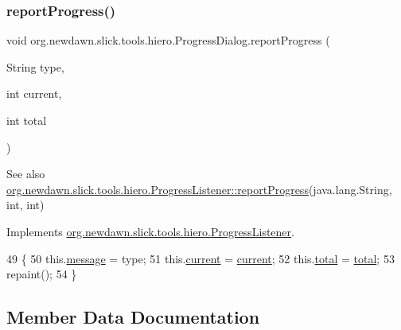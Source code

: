 \subsubsection{\texorpdfstring{report\+Progress()}{reportProgress()}}
{\footnotesize\ttfamily void org.\+newdawn.\+slick.\+tools.\+hiero.\+Progress\+Dialog.\+report\+Progress (\begin{DoxyParamCaption}\item[{String}]{type,  }\item[{int}]{current,  }\item[{int}]{total }\end{DoxyParamCaption})\hspace{0.3cm}{\ttfamily [inline]}}

\begin{DoxySeeAlso}{See also}
\mbox{\hyperlink{interfaceorg_1_1newdawn_1_1slick_1_1tools_1_1hiero_1_1_progress_listener_a2b34243285df0b11dc2719c062474cfc}{org.\+newdawn.\+slick.\+tools.\+hiero.\+Progress\+Listener\+::report\+Progress}}(java.\+lang.\+String, int, int) 
\end{DoxySeeAlso}


Implements \mbox{\hyperlink{interfaceorg_1_1newdawn_1_1slick_1_1tools_1_1hiero_1_1_progress_listener_a2b34243285df0b11dc2719c062474cfc}{org.\+newdawn.\+slick.\+tools.\+hiero.\+Progress\+Listener}}.


\begin{DoxyCode}
49                                                                     \{
50         this.\mbox{\hyperlink{classorg_1_1newdawn_1_1slick_1_1tools_1_1hiero_1_1_progress_dialog_acd9d79724bb00dac233a3fb61df9b3e8}{message}} = type;
51         this.\mbox{\hyperlink{classorg_1_1newdawn_1_1slick_1_1tools_1_1hiero_1_1_progress_dialog_aba73b86e01e2e9a3cde55146ce905aa5}{current}} = \mbox{\hyperlink{classorg_1_1newdawn_1_1slick_1_1tools_1_1hiero_1_1_progress_dialog_aba73b86e01e2e9a3cde55146ce905aa5}{current}};
52         this.\mbox{\hyperlink{classorg_1_1newdawn_1_1slick_1_1tools_1_1hiero_1_1_progress_dialog_a7facb05047f254e898637bdfde4d3000}{total}} = \mbox{\hyperlink{classorg_1_1newdawn_1_1slick_1_1tools_1_1hiero_1_1_progress_dialog_a7facb05047f254e898637bdfde4d3000}{total}};
53         repaint();
54     \}
\end{DoxyCode}


\subsection{Member Data Documentation}
\mbox{\label{classorg_1_1newdawn_1_1slick_1_1tools_1_1hiero_1_1_progress_dialog_aba73b86e01e2e9a3cde55146ce905aa5}} 
